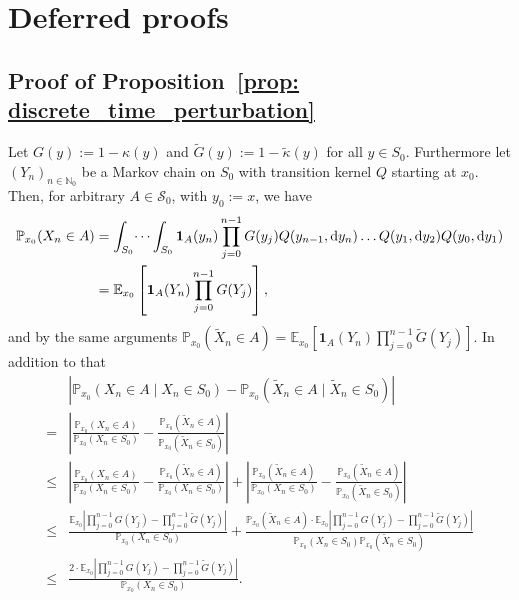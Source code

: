 \documentclass{aptpub}
\begin{document}
\section{Deferred proofs}\label{sec:pf_bdd}

\subsection{Proof of Proposition~\ref{prop: discrete_time_perturbation}}
\label{sec:Discrete_time}

	Let $G(y) := 1-\kappa(y)$ and $\widetilde{G}(y) := 1 - \widetilde{\kappa}(y)$ for all $y\in S_0$. Furthermore let $(Y_n)_{n\in\mathbb{N}_0}$ be a Markov chain on $S_0$ with transition kernel $Q$ starting at $x_0$. Then, for arbitrary
	$A \in \mathcal S_0$,
	with $y_0:= x$, we have
	\begin{align*}
		\mathbb{P}_{x_0}(X_n\in A) 
		& = \int_{S_0} \dots \int_{S_0} \mathbf{1}_A(y_n) \prod_{j=0}^{n-1} G(y_j) Q(y_{n-1},{\rm d}y_n) \dots Q(y_1,{\rm d}y_2) Q(y_0,{\rm d} y_1)\\
		 & = \mathbb{E}_{x_0} \left[\mathbf{1}_A(Y_n) \prod_{j=0}^{n-1} G(Y_j) \right],
		\end{align*}
	and by the same arguments $	\mathbb{P}_{x_0}(\widetilde{X}_n\in A) = \mathbb{E}_{x_0} \left[ \mathbf{1}_A(Y_n) \prod_{j=0}^{n-1} \widetilde{G}(Y_j) \right]$. In addition to that
	\allowdisplaybreaks
	\begin{align*}
	    &  \left \vert \mathbb{P}_{x_0}(X_n\in A\mid X_n\in S_0) 
  			- \mathbb{P}_{x_0}(\widetilde{X}_n\in A\mid \widetilde{X}_n\in S_0)\right \vert \\
= 		& \left \vert \frac{\mathbb{P}_{x_0}(X_n\in A)}{\mathbb{P}_{x_0}(X_n\in S_0)} 
			- \frac{\mathbb{P}_{x_0}(\widetilde{X}_n\in A)}{\mathbb{P}_{x_0}(\widetilde{X}_n\in S_0)} \right \vert \\
\leq 	& \left \vert \frac{\mathbb{P}_{x_0}(X_n\in A)}{\mathbb{P}_{x_0}(X_n\in S_0)} 
				- \frac{\mathbb{P}_{x_0}(\widetilde{X}_n\in A)}{\mathbb{P}_{x_0}(X_n\in S_0)} \right \vert 
			+ \left\vert  \frac{\mathbb{P}_{x_0}(\widetilde{X}_n\in A)}{\mathbb{P}_{x_0}(X_n\in S_0)}
				- \frac{\mathbb{P}_{x_0}(\widetilde{X}_n\in A)}{\mathbb{P}_{x_0}(\widetilde{X}_n\in S_0)} \right \vert\\
\leq 	& \frac{\mathbb{E}_{x_0}\left \vert \prod_{j=0}^{n-1} G(Y_j) 
			- \prod_{j=0}^{n-1} \widetilde{G}(Y_j) \right \vert}{\mathbb{P}_{x_0}(X_n\in S_0)} 
			+ \frac{\mathbb{P}_{x_0}(\widetilde{X}_n\in A)\cdot \mathbb{E}_{x_0}\left \vert \prod_{j=0}^{n-1} G(Y_j) 
				- \prod_{j=0}^{n-1} \widetilde{G}(Y_j) \right \vert}{\mathbb{P}_{x_0}(X_n\in S_0) \mathbb{P}_{x_0}(\widetilde{X}_n\in S_0)}\\
\leq 	&  \frac{2 \cdot \mathbb{E}_{x_0}\left \vert \prod_{j=0}^{n-1} G(Y_j) 
				- \prod_{j=0}^{n-1} \widetilde{G}(Y_j) \right \vert}{\mathbb{P}_{x_0}(X_n\in S_0)}.
	\end{align*}  
\end{document}
